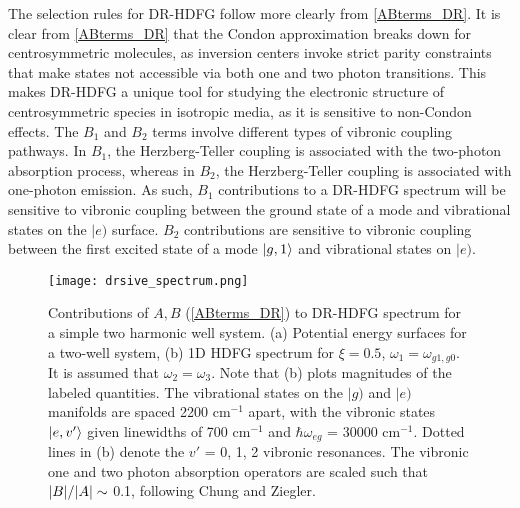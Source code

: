 \documentclass[aip, jcp, reprint, onecolumn]{revtex4-2}
\begin{document}
The selection rules for DR-HDFG follow more clearly from \autoref{ABterms_DR}.
It is clear from \autoref{ABterms_DR} that the Condon approximation breaks down for centrosymmetric molecules, as inversion centers invoke strict parity constraints that make states not accessible via both one and two photon transitions. \cite{Milojevich2013, RN230}
This makes DR-HDFG a unique tool for studying the electronic structure of centrosymmetric species in isotropic media, as it is sensitive to non-Condon effects. \cite{Olson2018}
The $B_1$ and $B_2$ terms involve different types of vibronic coupling pathways.
In $B_1$, the Herzberg-Teller coupling is associated with the two-photon absorption process, whereas in $B_2$, the Herzberg-Teller coupling is associated with one-photon emission.
As such, $B_1$ contributions to a DR-HDFG spectrum will be sensitive to vibronic coupling between the ground state of a mode and vibrational states on the $|e)$ surface. 
$B_2$ contributions are sensitive to vibronic coupling between the first excited state of a mode $\ket{g,1}$ and vibrational states on $|e)$.

\begin{figure*}[!htbp]
	\centering
	\texttt{[image: drsive\_spectrum.png]}
	\caption{Contributions of $A, B$ (\autoref{ABterms_DR}) to DR-HDFG spectrum for a simple two harmonic well system.
		(a) Potential energy surfaces for a two-well system, (b) 1D HDFG spectrum for $\xi = 0.5$, $\omega_1 = \omega_{g1, g0}$. 
		It is assumed that $\omega_2 = \omega_3$.
		Note that (b) plots magnitudes of the labeled quantities.
		The vibrational states on the $|g)$ and $|e)$ manifolds are spaced 2200 cm$^{-1}$ apart, with the vibronic states $\ket{e,v'}$ given linewidths of 700 cm$^{-1}$ and $\hbar \omega_{eg}$ = 30000 cm$^{-1}$.
		Dotted lines in (b) denote the $v'$ = 0, 1, 2 vibronic resonances. 
		The vibronic one and two photon absorption operators are scaled such that $\abs{B}/\abs{A} \sim$ 0.1, following Chung and Ziegler. \cite{Ziegler1988}}
	\label{fig:doubres_spec}
\end{figure*}
\end{document}
